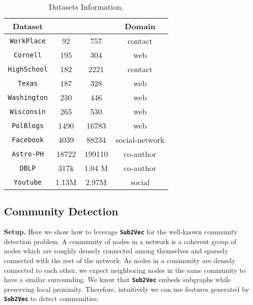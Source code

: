 \documentclass[sigconf]{acmart}
\newcommand{\alg}{{\bf {\tt Sub2Vec}}\xspace}
\newcommand{\workplace}{{\tt WorkPlace}\xspace}
\newcommand{\highschool}{{\tt HighSchool}\xspace}
\newcommand{\dblp}{{\tt DBLP}\xspace}
\newcommand{\youtube}{{\tt Youtube}\xspace}
\newcommand{\polblogs}{{\tt PolBlogs}\xspace}
\newcommand{\texas}{{\tt Texas}\xspace}
\newcommand{\wisconsin}{{\tt Wisconsin}\xspace}
\newcommand{\washington}{{\tt Washington}\xspace}
\newcommand{\cornell}{{\tt Cornell}\xspace}
\newcommand{\facebook}{{\tt Facebook}\xspace}
\newcommand{\arxiv}{{\tt Astro-PH}\xspace}
\begin{document}
{
\small
\begin{table}

\centering
\caption{\label{tab:datasets}Datasets Information.}
\begin{tabular}{|c|c|c|c|}
	\hline
 \textbf{Dataset}  & \textbf{} & \textbf{}  & \textbf{Domain} \\ \hline

\workplace \cite{NWS:9950811}  & 92 & 757 & contact  \\ \hline
\cornell \cite{sen:aimag08} & 195 & 304 & web\\ \hline
\highschool \cite{10.1371/journal.pone.0107878} &  182 & 2221 & contact\\ \hline
\texas \cite{sen:aimag08}  & 187 & 328 & web\\ \hline
\washington \cite{sen:aimag08}   & 230 & 446  & web\\ \hline
\wisconsin  \cite{sen:aimag08} & 265 & 530 & web\\ \hline
\polblogs  \cite{adamic2005political}& 1490 & 16783 & web\\ \hline
\facebook \cite{leskovec2012learning}  & 4039 & 88234 & social-network\\ \hline
\arxiv \cite{leskovec2007graph}  & 18722 & 199110 & co-author\\ \hline
\dblp \cite{yang2015defining} &  317k & 1.04 M & co-author \\ \hline
\youtube \cite{yang2015defining} &  1.13M & 2.97M & social\\ \hline



\end{tabular}

\end{table}
}




\subsection{Community Detection}

\par \noindent 
\textbf{Setup.} Here we show how to leverage \alg for the well-known community detection problem. A community of nodes in a network is a coherent group of nodes which are roughly densely connected among themselves and sparsely connected with the rest of the network. As nodes in a community are densely connected to each other, we expect neighboring nodes in the same community to have a similar surrounding. We know that \alg embeds subgraphs while preserving local proximity. Therefore, intuitively we can use features generated by \alg to detect communities. 
\end{document}
